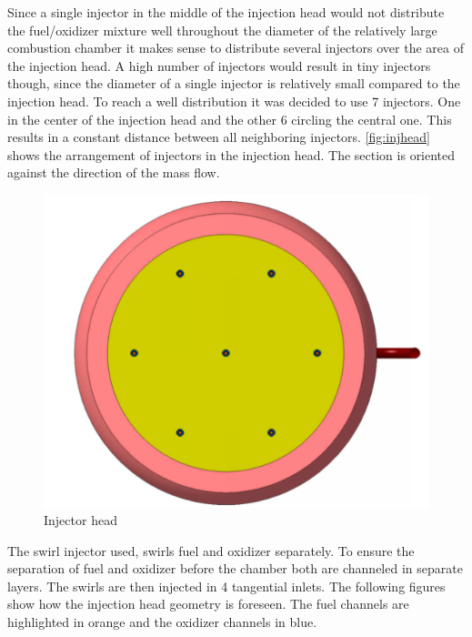 Since a single injector in the middle of the injection head would not distribute the fuel/oxidizer mixture well throughout the diameter of the relatively large combustion chamber it makes sense to distribute several injectors over the area of the injection head. A high number of injectors would result in tiny injectors though, since the diameter of a single injector is relatively small compared to the injection head. To reach a well distribution it was decided to use 7 injectors. One in the center of the injection head and the other 6 circling the central one. This results in a constant distance between all neighboring injectors. \autoref{fig:injhead} shows the arrangement of injectors in the injection head. The section is oriented against the direction of the mass flow.

\begin{figure}[H]
	\centering\includegraphics[width=0.8\linewidth]{injhead}
	\caption{Injector head}\label{fig:injhead}
\end{figure}

The swirl injector used, swirls fuel and oxidizer separately. To ensure the separation of fuel and oxidizer before the chamber both are channeled in separate layers. The swirls are then injected in 4 tangential inlets. The following figures show how the injection head geometry is foreseen. The fuel channels are highlighted in orange and the oxidizer channels in blue.

